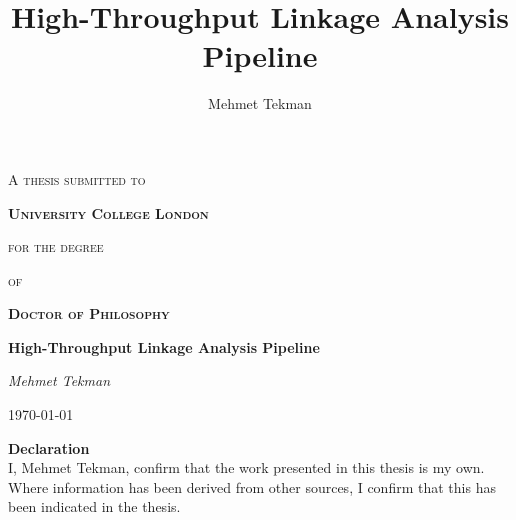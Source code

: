 \documentclass[11pt]{report} %
\author{Mehmet Tekman}
\title{High-Throughput Linkage Analysis Pipeline}
\begin{document}
\begin{spacing}{1}
\begin{titlepage}
	\centering
	{\scshape\Large A thesis submitted to\par}
	{\scshape\LARGE\bf University College London\par}
	{\scshape\Large for the degree\par}
	{\scshape\Large of\par}
	{\scshape\LARGE\bf Doctor of Philosophy\par}
	\vspace{1cm}

	\vspace{1.5cm}
	{\huge\bfseries High-Throughput Linkage Analysis Pipeline\par}
	\vspace{2cm}
	{\Large\itshape Mehmet Tekman\par}
	\vfill

	{\large \today\par}
\end{titlepage}

\pagebreak
{\noindent \bf Declaration}\\
{\noindent I, Mehmet Tekman, confirm that the work presented in this thesis is my own. Where information has been derived from other sources, I confirm that this has been indicated in the thesis.}
\pagebreak

%


\tableofcontents
\end{spacing}

%

\pagebreak

%
%
%
%
%



\begin{spacing}{1}

\end{spacing}
\end{document}
